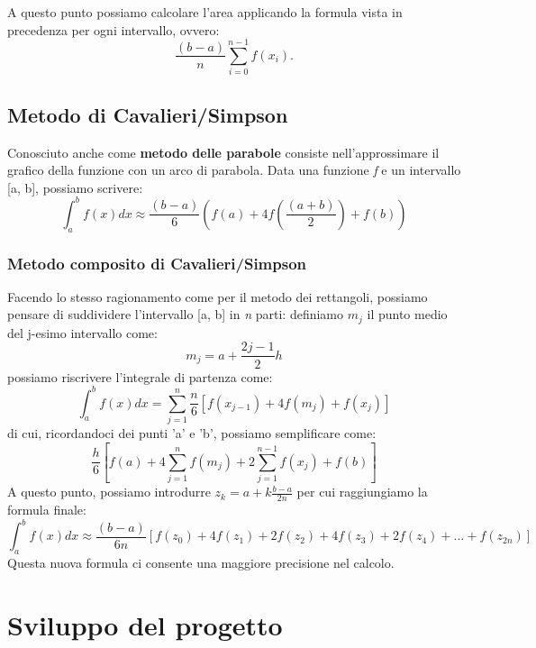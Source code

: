 \documentclass{article}
\begin{document}
A questo punto possiamo calcolare l'area applicando la formula vista in precedenza per ogni intervallo, ovvero:
\begin{equation*}
   \frac{(b-a)}{n} \sum_{i=0}^{n-1} f(x_i).
\end{equation*}

\subsection{Metodo di Cavalieri/Simpson}
Conosciuto anche come \textbf{metodo delle parabole} consiste nell'approssimare il grafico della funzione con un arco di parabola. Data una funzione \textit{f} e un intervallo 
[a, b], possiamo scrivere:
\begin{equation*}
   \int_{a}^{b} f(x) dx \approx \frac{(b-a)}{6} \left( f(a)+4f\left(\frac{(a+b)}{2} \right) + f(b) \right)
\end{equation*}
\subsubsection{Metodo composito di Cavalieri/Simpson}
Facendo lo stesso ragionamento come per il metodo dei rettangoli, possiamo pensare di suddividere l'intervallo [a, b] in \textit{n} parti: definiamo $m_j$ il punto medio del 
j-esimo intervallo come:
\begin{equation*}
   m_j = a + \frac{2j-1}{2}h
\end{equation*}
possiamo riscrivere l'integrale di partenza come:
\begin{equation*}
   \int_{a}^{b} f(x) dx = \sum_{j=1}^{n} \frac{n}{6} [f(x_{j-1}) +4f(m_j) + f(x_j)]
\end{equation*}
di cui, ricordandoci dei punti 'a' e 'b', possiamo semplificare come:
\begin{equation*}
   \frac{h}{6} \left[ f(a) + 4 \sum_{j=1}^{n} f(m_j) + 2 \sum_{j=1}^{n-1} f(x_j) + f(b)\right]
\end{equation*}
A questo punto, possiamo introdurre $z_k = a + k \frac{b-a}{2n}$ per cui raggiungiamo la formula finale:
\begin{equation*}
   \int_{a}^{b} f(x) dx \approx \frac{(b-a)}{6n} [f(z_0) + 4 f(z_1) + 2f(z_2) + 4f(z_3) + 2f(z_4) + ... + f(z_{2n})]
\end{equation*}
Questa nuova formula ci consente una maggiore precisione nel calcolo.
\newpage
\section{Sviluppo del progetto}
\end{document}
